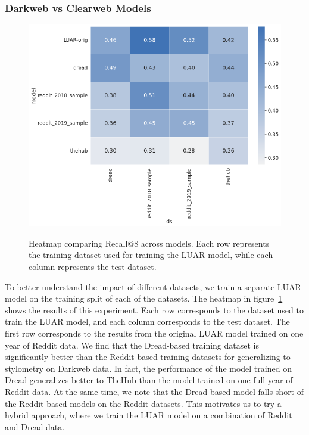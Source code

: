 \subsubsection{Darkweb vs Clearweb Models}
\begin{figure}
    \centering
    \includegraphics[width=0.8\linewidth,alt={Heatmap comparing Recall@8 across models.}]{stylometryExtensions/figures/results/rq2_trainedmodels} 
    \caption{Heatmap comparing Recall@8 across models. Each row represents the training dataset used for training the LUAR model, while each column represents the test dataset.}
    \label{fig:stylometry_extensions:followingTrail:results:rq2_trainedmodels}
\end{figure}
To better understand the impact of different datasets, we train a separate LUAR model on the training split of each of the datasets.
The heatmap in figure~\ref{fig:stylometry_extensions:followingTrail:results:rq2_trainedmodels} shows the results of this experiment.
Each row corresponds to the dataset used to train the LUAR model, and each column corresponds to the test dataset.
The first row corresponds to the results from the original LUAR model trained on one year of Reddit data.
We find that the Dread-based training dataset is significantly better than the Reddit-based training datasets for generalizing to stylometry on Darkweb data.
In fact, the performance of the model trained on Dread generalizes better to TheHub than the model trained on one full year of Reddit data.
At the same time, we note that the Dread-based model falls short of the Reddit-based models on the Reddit datasets.
This motivates us to try a hybrid approach, where we train the LUAR model on a combination of Reddit and Dread data.

